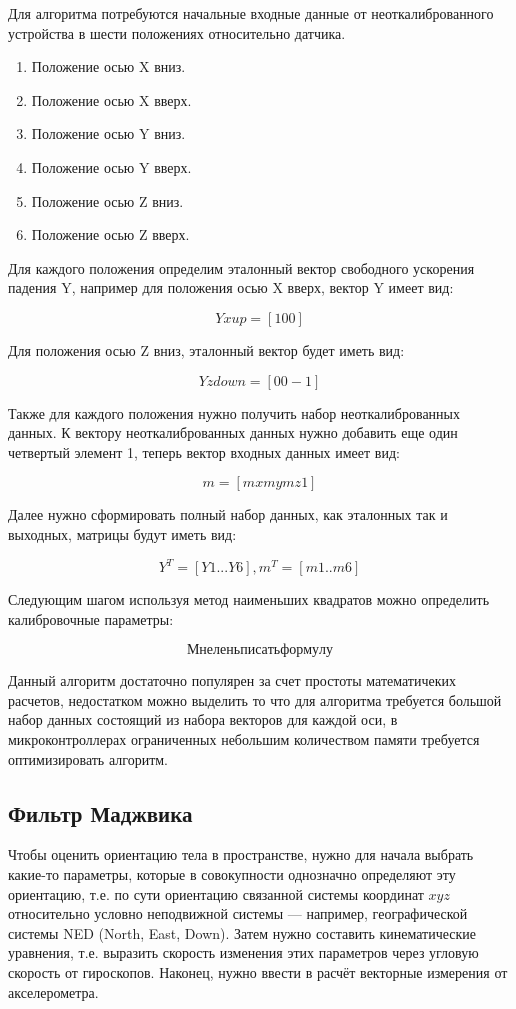Для алгоритма потребуются начальные входные данные от неоткалиброванного устройства в шести положениях относительно датчика.
\begin{enumerate}
    \item Положение осью X вниз.
    \item Положение осью X вверх.
    \item Положение осью Y вниз.
    \item Положение осью Y вверх.
    \item Положение осью Z вниз.
    \item Положение осью Z вверх.
\end{enumerate}

Для каждого положения определим эталонный вектор свободного ускорения падения Y, например для положения осью X вверх, вектор Y имеет вид:

$$ Yxup = [1 0 0] $$

Для положения осью Z вниз, эталонный вектор будет иметь вид:

$$ Yzdown = [0 0 -1] $$

Также для каждого положения нужно получить набор неоткалиброванных данных. 
К вектору неоткалиброванных данных нужно добавить еще один четвертый элемент 1, теперь вектор входных данных имеет вид:

$$ m = [mx my mz 1]$$

Далее нужно сформировать полный набор данных, как эталонных так и выходных, матрицы будут иметь вид:

$$ 
Y^T = [Y1...Y6],
m^T = [m1..m6]
$$

Следующим шагом используя метод наименьших квадратов можно определить калибровочные параметры:

$$  Мне лень писать формулу $$

Данный алгоритм достаточно популярен за счет простоты математичеких расчетов, недостатком можно выделить то что 
для алгоритма требуется большой набор данных состоящий из набора векторов для каждой оси, в микроконтроллерах ограниченных небольшим 
количеством памяти требуется оптимизировать алгоритм. 

\subsection{Фильтр Маджвика}

Чтобы оценить ориентацию тела в пространстве, нужно для начала выбрать какие-то параметры, 
которые в совокупности однозначно определяют эту ориентацию, т.е. по сути ориентацию связанной 
системы координат $xyz$ относительно условно неподвижной системы — например, географической системы NED (North, East, Down). 
Затем нужно составить кинематические уравнения, т.е. выразить скорость изменения этих параметров через угловую скорость от 
гироскопов. Наконец, нужно ввести в расчёт векторные измерения от акселерометра.

